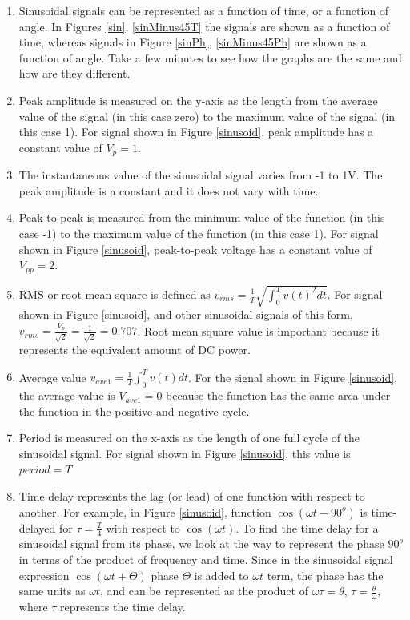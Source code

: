 \documentclass{ximera}
\begin{document}
\begin{enumerate}
\item Sinusoidal signals can be represented as a function of time, or a function of angle. In Figures \ref{sin}, \ref{sinMinus45T} the signals are shown as a function of time, whereas signals in Figure \ref{sinPh}, \ref{sinMinus45Ph} are shown as a function of angle. Take a few minutes to see how the graphs are the same and how are they different.
\item Peak amplitude is measured on the y-axis as the length from the average value of the signal (in this case zero) to the maximum value of the signal (in this case 1). For signal shown in Figure \ref{sinusoid}, peak  amplitude has a constant value of $V_p=1$. 
\item The instantaneous value of the sinusoidal signal varies from -1 to 1V. The peak amplitude is a constant and it does not vary with time. 
\item Peak-to-peak is measured from the minimum value of the function (in this case -1) to the maximum value of the function (in this case 1).  For signal shown in Figure \ref{sinusoid}, peak-to-peak voltage has a constant value of  $V_{pp}=2$.
\item RMS or root-mean-square is defined as $v_{rms}=\frac{1}{T} \sqrt{\int_0^T v(t)^2 dt}$. For signal shown in Figure \ref{sinusoid}, and other sinusoidal signals of this form,  $v_{rms}=\frac{V_p}{\sqrt{2}}=\frac{1}{\sqrt{2}}=0.707$. Root mean square value is important because it represents the equivalent amount of DC power.  
\item Average value $v_{ave1}=\frac{1}{T} \int_0^T v(t) dt$. For the signal shown in Figure \ref{sinusoid}, the average value is $V_{ave1}=0$ because the function has the same area under the function in the positive and negative cycle. 
\item Period is measured on the x-axis as the length of one full cycle of the sinusoidal signal. For signal shown in Figure \ref{sinusoid}, this value is $period=T$
\item Time delay represents the lag (or lead) of one function with respect to another. For example, in Figure \ref{sinusoid}, function $ \cos(\omega t - 90^o)$ is time-delayed for $\tau = \frac{T}{4}$ with respect to $\cos (\omega t)$. To find the time delay for a sinusoidal signal from its phase, we look at the way to represent the phase $90^o$ in terms of the product of frequency and time. Since in the sinusoidal signal expression $\cos (\omega t + \Theta)$  phase $\Theta$ is added to $\omega t$ term, the phase has the same units as $\omega t$, and can be represented as the product of $\omega \tau = \theta$, $\tau = \frac{\theta}{\omega}$, where $\tau$ represents the time delay.

\end{enumerate}
\end{document}
